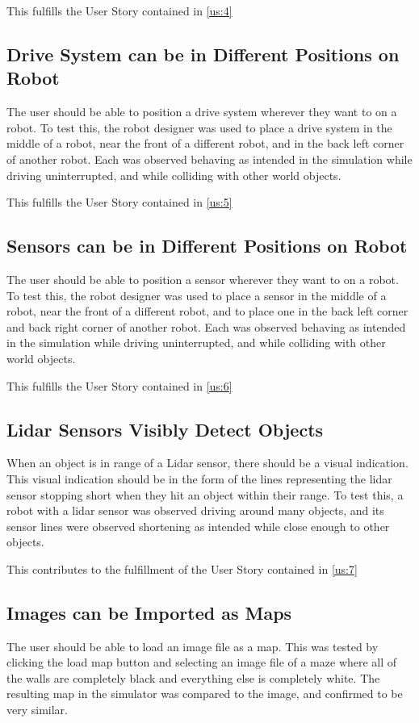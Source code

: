 This fulfills the User Story contained in \ref{us:4}

\subsection{Drive System can be in Different Positions on Robot}
The user should be able to position a drive system wherever they want to on a robot. To test this, the robot designer was used to place a drive system in the middle of a robot, near the front of a different robot, and in the back left corner of another robot. Each was observed behaving as intended in the simulation while driving uninterrupted, and while colliding with other world objects.

This fulfills the User Story contained in \ref{us:5}

\subsection{Sensors can be in Different Positions on Robot}
The user should be able to position a sensor wherever they want to on a robot. To test this, the robot designer was used to place a sensor in the middle of a robot, near the front of a different robot, and to place one in the back left corner and back right corner of another robot. Each was observed behaving as intended in the simulation while driving uninterrupted, and while colliding with other world objects.

This fulfills the User Story contained in \ref{us:6}

\subsection{Lidar Sensors Visibly Detect Objects}
When an object is in range of a Lidar sensor, there should be a visual indication. This visual indication should be in the form of the lines representing the lidar sensor stopping short when they hit an object within their range. To test this, a robot with a lidar sensor was observed driving around many objects, and its sensor lines were observed shortening as intended while close enough to other objects.

This contributes to the fulfillment of the User Story contained in \ref{us:7}

\subsection{Images can be Imported as Maps}
The user should be able to load an image file as a map. This was tested by clicking the load map button and selecting an image file of a maze where all of the walls are completely black and everything else is completely white. The resulting map in the simulator was compared to the image, and confirmed to be very similar.

